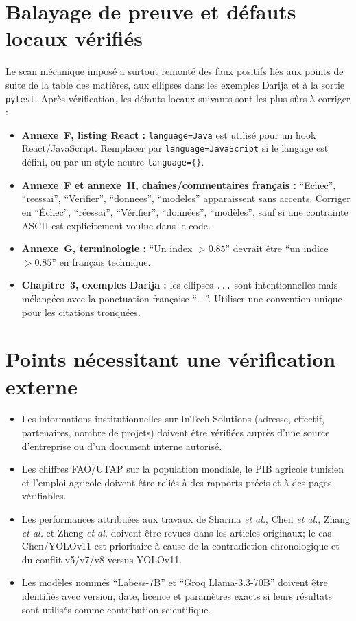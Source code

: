 \documentclass[11pt,a4paper]{article}
\begin{document}
\section*{Balayage de preuve et défauts locaux vérifiés}

Le scan mécanique imposé a surtout remonté des faux positifs liés aux points de suite de la table des matières, aux ellipses dans les exemples Darija et à la sortie \texttt{pytest}. Après vérification, les défauts locaux suivants sont les plus sûrs à corriger :

\begin{itemize}
  \item \textbf{Annexe~F, listing React :} \texttt{language=Java} est utilisé pour un hook React/JavaScript. Remplacer par \texttt{language=JavaScript} si le langage est défini, ou par un style neutre \texttt{language=\{\}}.
  \item \textbf{Annexe~F et annexe~H, chaînes/commentaires français :} \enquote{Echec}, \enquote{reessai}, \enquote{Verifier}, \enquote{donnees}, \enquote{modeles} apparaissent sans accents. Corriger en \enquote{Échec}, \enquote{réessai}, \enquote{Vérifier}, \enquote{données}, \enquote{modèles}, sauf si une contrainte ASCII est explicitement voulue dans le code.
  \item \textbf{Annexe~G, terminologie :} \enquote{Un index \(>0.85\)} devrait être \enquote{un indice \(>0.85\)} en français technique.
  \item \textbf{Chapitre~3, exemples Darija :} les ellipses \texttt{...} sont intentionnelles mais mélangées avec la ponctuation française \enquote{\ldots\,}. Utiliser une convention unique pour les citations tronquées.
\end{itemize}

\section*{Points nécessitant une vérification externe}

\begin{itemize}
  \item Les informations institutionnelles sur InTech Solutions (adresse, effectif, partenaires, nombre de projets) doivent être vérifiées auprès d'une source d'entreprise ou d'un document interne autorisé.
  \item Les chiffres FAO/UTAP sur la population mondiale, le PIB agricole tunisien et l'emploi agricole doivent être reliés à des rapports précis et à des pages vérifiables.
  \item Les performances attribuées aux travaux de Sharma \textit{et al.}, Chen \textit{et al.}, Zhang \textit{et al.} et Zheng \textit{et al.} doivent être revues dans les articles originaux; le cas Chen/YOLOv11 est prioritaire à cause de la contradiction chronologique et du conflit v5/v7/v8 versus YOLOv11.
  \item Les modèles nommés \enquote{Labess-7B} et \enquote{Groq Llama-3.3-70B} doivent être identifiés avec version, date, licence et paramètres exacts si leurs résultats sont utilisés comme contribution scientifique.
\end{itemize}
\end{document}
